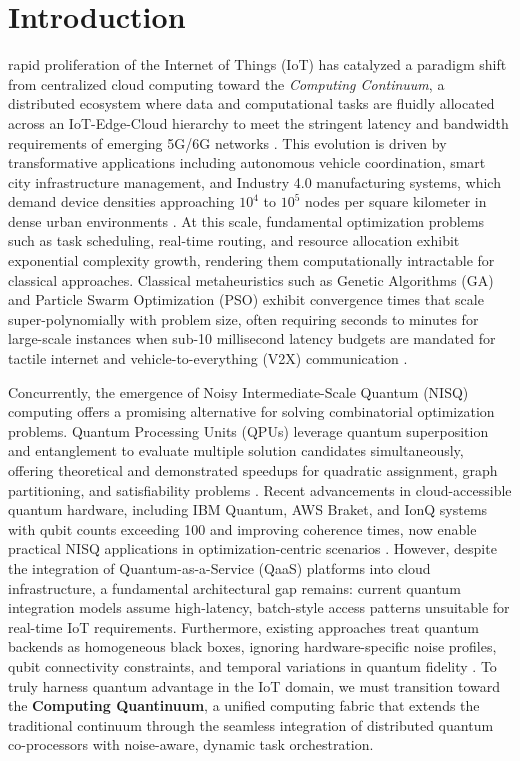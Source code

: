 \documentclass[lettersize,journal]{IEEEtran}
\begin{document}
\section{Introduction}\label{sec:introduction}
 rapid proliferation of the Internet of Things (IoT) has catalyzed a paradigm shift from centralized cloud computing toward the \textit{Computing Continuum}, a distributed ecosystem where data and computational tasks are fluidly allocated across an IoT-Edge-Cloud hierarchy to meet the stringent latency and bandwidth requirements of emerging 5G/6G networks \cite{Zhu2023}. This evolution is driven by transformative applications including autonomous vehicle coordination, smart city infrastructure management, and Industry 4.0 manufacturing systems, which demand device densities approaching $10^4$ to $10^5$ nodes per square kilometer in dense urban environments \cite{ITU2023}. At this scale, fundamental optimization problems such as task scheduling, real-time routing, and resource allocation exhibit exponential complexity growth, rendering them computationally intractable for classical approaches. Classical metaheuristics such as Genetic Algorithms (GA) and Particle Swarm Optimization (PSO) exhibit convergence times that scale super-polynomially with problem size, often requiring seconds to minutes for large-scale instances when sub-10 millisecond latency budgets are mandated for tactile internet and vehicle-to-everything (V2X) communication \cite{Popovski2018}.

Concurrently, the emergence of Noisy Intermediate-Scale Quantum (NISQ) computing offers a promising alternative for solving combinatorial optimization problems. Quantum Processing Units (QPUs) leverage quantum superposition and entanglement to evaluate multiple solution candidates simultaneously, offering theoretical and demonstrated speedups for quadratic assignment, graph partitioning, and satisfiability problems \cite{Preskill2018,Farhi2014,Lucas2014}. Recent advancements in cloud-accessible quantum hardware, including IBM Quantum, AWS Braket, and IonQ systems with qubit counts exceeding 100 and improving coherence times, now enable practical NISQ applications in optimization-centric scenarios \cite{IBMQuantum2023,Harrigan2021}. However, despite the integration of Quantum-as-a-Service (QaaS) platforms into cloud infrastructure, a fundamental architectural gap remains: current quantum integration models assume high-latency, batch-style access patterns unsuitable for real-time IoT requirements. Furthermore, existing approaches treat quantum backends as homogeneous black boxes, ignoring hardware-specific noise profiles, qubit connectivity constraints, and temporal variations in quantum fidelity \cite{Tannu2019}. To truly harness quantum advantage in the IoT domain, we must transition toward the \textbf{Computing Quantinuum}, a unified computing fabric that extends the traditional continuum through the seamless integration of distributed quantum co-processors with noise-aware, dynamic task orchestration.
\end{document}
